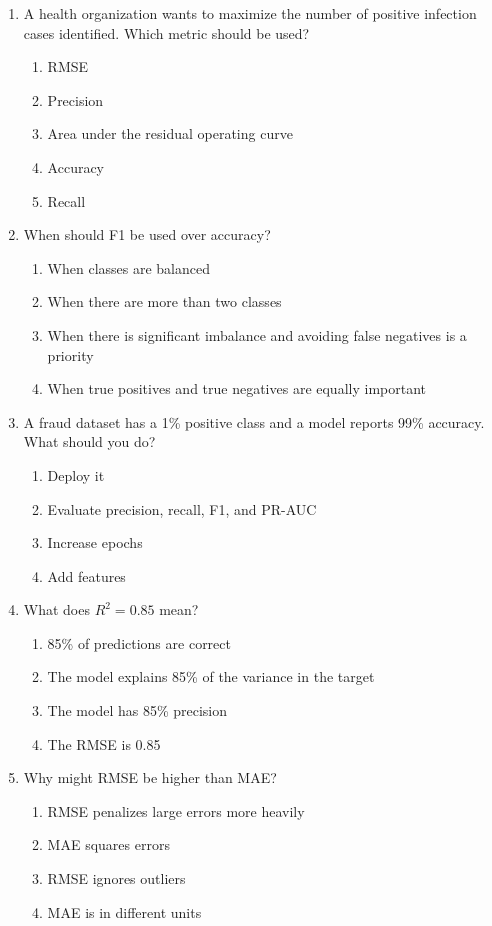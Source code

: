 \documentclass[11pt]{article}
\begin{document}
\begin{enumerate}[leftmargin=*, label=\textbf{Q\arabic*.}, start=58]
		\item A health organization wants to maximize the number of positive infection cases identified. Which metric should be used?
		\begin{enumerate}[label=(\alph*)]
			\item RMSE
			\item Precision
			\item Area under the residual operating curve
			\item Accuracy
			\item Recall
		\end{enumerate}
		
		\item When should F1 be used over accuracy?
		\begin{enumerate}[label=(\alph*)]
			\item When classes are balanced
			\item When there are more than two classes
			\item When there is significant imbalance and avoiding false negatives is a priority
			\item When true positives and true negatives are equally important
		\end{enumerate}
		
		\item A fraud dataset has a 1\% positive class and a model reports 99\% accuracy. What should you do?
		\begin{enumerate}[label=(\alph*)]
			\item Deploy it
			\item Evaluate precision, recall, F1, and PR-AUC
			\item Increase epochs
			\item Add features
		\end{enumerate}
		
		\item What does $R^2 = 0.85$ mean?
		\begin{enumerate}[label=(\alph*)]
			\item 85\% of predictions are correct
			\item The model explains 85\% of the variance in the target
			\item The model has 85\% precision
			\item The RMSE is 0.85
		\end{enumerate}
		
		\item Why might RMSE be higher than MAE?
		\begin{enumerate}[label=(\alph*)]
			\item RMSE penalizes large errors more heavily
			\item MAE squares errors
			\item RMSE ignores outliers
			\item MAE is in different units
		\end{enumerate}
		

\end{enumerate}
\end{document}
